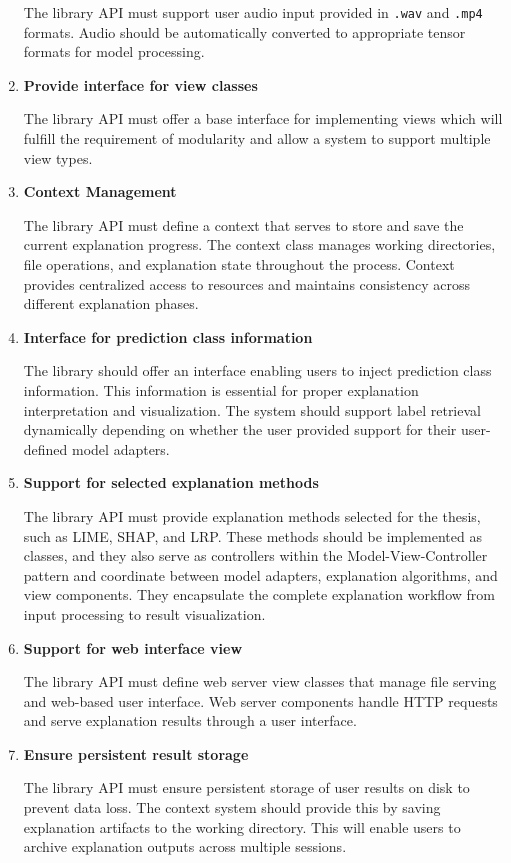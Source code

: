 \documentclass[
    bindingoffset=5mm,  %
    footnoteindent=3mm, %
    hyphenation=true    %
]{src/wut-thesis}
\begin{document}
\begin{enumerate}
        The library API must support user audio input provided in \texttt{.wav} and \texttt{.mp4} formats.
    Audio should be automatically converted to appropriate tensor formats for model processing.

    \item \textbf{Provide interface for view classes}

        The library API must offer a base interface for implementing views which will fulfill
    the requirement of modularity and allow a system to support multiple view types.

    \item \textbf{Context Management}

        The library API must define a context that serves to store and save the current explanation progress.
    The context class manages working directories, file operations, and explanation state throughout the process.
    Context provides centralized access to resources and maintains consistency across different explanation phases.

    \item \textbf{Interface for prediction class information}

        The library should offer an interface enabling users to inject prediction class information.
    This information is essential for proper explanation interpretation and visualization.
    The system should support label retrieval dynamically depending on whether the user provided
    support for their user-defined model adapters.

    \item \textbf{Support for selected explanation methods}

        The library API must provide explanation methods selected for the thesis, such as LIME, SHAP, and LRP.
    These methods should be implemented as classes, and they also serve as controllers within
    the Model-View-Controller pattern and coordinate between model adapters, explanation algorithms, and view components. They encapsulate the complete explanation workflow from input processing to result visualization.

    \item \textbf{Support for web interface view}

        The library API must define web server view classes that manage file serving and web-based user interface.
    Web server components handle HTTP requests and serve explanation results through a user interface.

    \item \textbf{Ensure persistent result storage}

        The library API must ensure persistent storage of user results on disk to prevent
    data loss. The context system should provide this by saving explanation artifacts to
    the working directory. This will enable users to archive explanation outputs across 
    multiple sessions.
    
    \end{enumerate}
\end{document}
